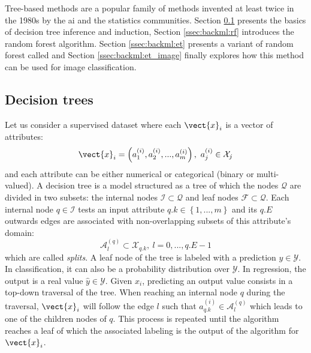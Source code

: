 Tree-based methods are a popular family of methods invented at least twice in the
1980s by the \acrshort{ai} \cite{quinlan1986induction} and the statistics
\cite{breiman1984classification} communities. Section \ref{ssec:backml:dt}
presents the basics of decision tree inference and induction, Section \ref{ssec:backml:rf}
introduces the random forest algorithm. Section \ref{ssec:backml:et} presents a
variant of random forest called  and Section \ref{ssec:backml:et_image}
finally explores how this method can be used for image classification.

\subsection{Decision trees}
\label{ssec:backml:dt}

Let us consider a supervised dataset where each $\vect{x}_i$ is a vector of
attributes:
\begin{equation}
\label{eqn:backml:dt:vectattributes}
\vect{x}_i = \left(a^{(i)}_1, a^{(i)}_2, ..., a^{(i)}_m\right),~a^{(i)}_j \in \mathcal{X}_j
\end{equation}
and each attribute can be either numerical or categorical (binary or multi-valued).
A decision tree is a model structured as a tree of which the nodes $\mathcal{Q}$
are divided in two subsets: the internal nodes $\mathcal{I} \subset \mathcal{Q}$ and leaf nodes
$\mathcal{F} \subset \mathcal{Q}$. Each internal node $q \in \mathcal{I}$
tests an input attribute $q.k \in \left\{1,...,m\right\}$ and its $q.E$ outwards
edges are associated with non-overlapping subsets of this attribute's domain:
\begin{equation}
\label{eqn:backml:dt:splitsgeneric}
\mathcal{A}^{(q)}_l \subset \mathcal{X}_{q.k},~l = 0,...,q.E-1
\end{equation}
which are called \textit{splits}. A leaf node of the tree is labeled with a
prediction $\hat{y} \in \mathcal{Y}$. In classification, it can also be a probability
distribution over $\mathcal{Y}$. In regression, the output is a real value
$\hat{y} \in \mathcal{Y}$. Given $x_i$, predicting an output value consists in a
top-down traversal of the tree. When reaching an internal node $q$ during the
traversal, $\vect{x}_i$ will follow the edge $l$ such that $a^{(i)}_{q.k} \in \mathcal{A}^{(q)}_l$
which leads to one of the children nodes of $q$. This process is repeated until
the algorithm reaches a leaf of which the associated labeling is the output of
the algorithm for $\vect{x}_i$.

